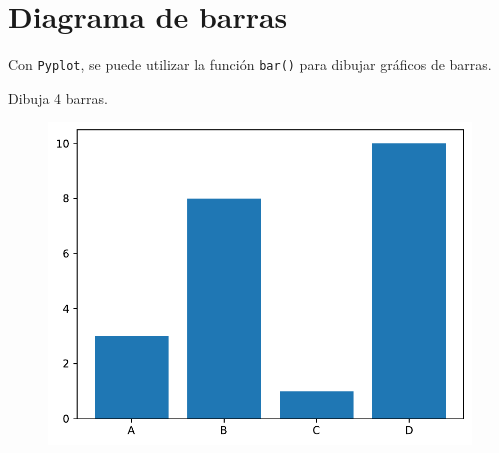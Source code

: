\section{Diagrama de barras}

Con \texttt{Pyplot}, se puede utilizar la función \texttt{bar()} para dibujar gráficos de barras.\\

\begin{code} Dibuja 4 barras.

\begin{Shaded}
\begin{Highlighting}[]

\OperatorTok{=}\NormalTok{ np.array([}\NormalTok{, }\NormalTok{, }\NormalTok{, }\NormalTok{])}
\OperatorTok{=}\NormalTok{ np.array([}\NormalTok{, }\NormalTok{, }\NormalTok{, }\NormalTok{])}

\end{Highlighting}
\end{Shaded}

\begin{figure}
  \centering
  \includegraphics[scale=0.6]{img/grafica1045.pdf}
\end{figure}
\end{code}

